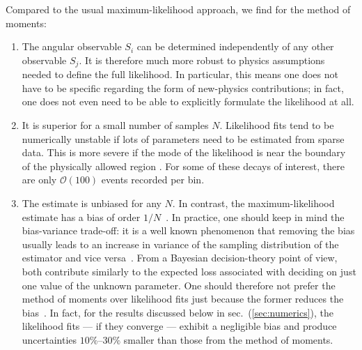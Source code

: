 \documentclass[aps,nofootinbib,preprintnumbers,prd,twocolumn]{revtex4-1}
\newcommand{\order}[1]{\mathcal{O}\left({#1}\right)}
\newcommand{\refsec}[1]{sec.~(\ref{sec:#1})}
\begin{document}
Compared to the usual maximum-likelihood approach, we find for the method of moments:
\begin{enumerate}
  \item The angular observable ${S_i}$ can be determined
  independently of any other observable ${S_j}$. It is therefore
  much more robust to physics assumptions needed to define the full
  likelihood. In particular, this means one does not have to be
  specific regarding the form of new-physics contributions; in fact,
  one does not even need to be able to explicitly formulate the
  likelihood at all.
\item It is superior for a small number of samples $N$. Likelihood
  fits tend to be numerically unstable if lots of parameters need to
  be estimated from sparse data. This is more severe if the mode of
  the likelihood is near the boundary of the physically allowed
  region \cite{lehmann1998}. For some of these decays of interest, there are only $\order{100}$ events
  recorded per bin.

\item The estimate is unbiased for any $N$. In contrast, the
  maximum-likelihood estimate has a bias of order
  $1/N$~\cite{Cox:1968}. In practice, one should keep in mind the
  bias-variance trade-off: it is a well known phenomenon that removing
  the bias usually leads to an increase in variance of the sampling
  distribution of the estimator and vice versa~\cite[sec. 7.3]{James:2006zz}. From a
  Bayesian decision-theory point of view, both contribute similarly to
  the expected loss associated with deciding on just one value of the
  unknown parameter. One should therefore not prefer the method of moments
  over likelihood fits just because the former reduces
  the bias~\cite[sections 13.8,17.2]{jaynes:2003}. In fact, for
  the results discussed below in \refsec{numerics}, the likelihood
  fits --- if they converge --- exhibit a negligible bias and
  produce uncertainties $10\%$--$30\%$ smaller than those from the method of moments.


\end{enumerate}
\end{document}
